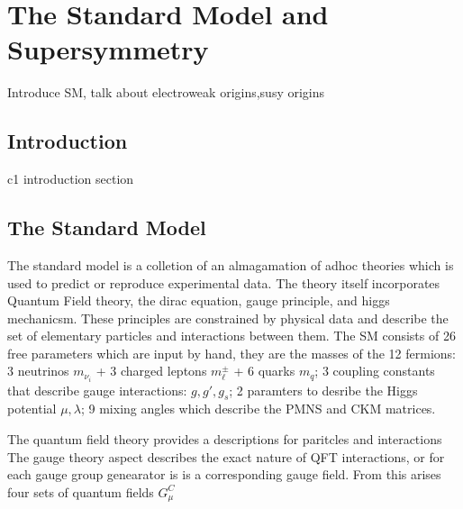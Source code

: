 



\setcounter{secnumdepth}{3}
\setcounter{tocdepth}{3}
\setlength{\parskip}{\smallskipamount}
\setlength{\parindent}{0pt}


\makeatletter


\providecommand{\tabularnewline}{\\}


\makeatother

%

\chapter{The Standard Model and Supersymmetry}

\begin{chapterabstract}
Introduce SM, talk about electroweak origins,susy origins
\end{chapterabstract}

\section{Introduction}

c1 introduction section

\section{The Standard Model}

The standard model is a colletion of an almagamation of adhoc theories which is used to predict or reproduce experimental data. The theory itself incorporates Quantum Field theory, the dirac equation, gauge principle, and higgs mechanicsm. These principles are constrained by physical data and describe the set of elementary particles and interactions between them. The SM  consists of 26 free parameters which are input by hand, they are the masses of the 12 fermions: 3 neutrinos $m_\nu_i$ + 3 charged leptons $m_\ell^\pm$ + 6 quarks $m_q$; 3 coupling constants that describe gauge interactions: $g, g', g_s$; 2 paramters to desribe the Higgs potential $\mu, \lambda$; 9 mixing angles which describe the  PMNS and CKM matrices.

The quantum field theory provides a descriptions for paritcles and interactions
The gauge theory aspect describes the exact nature of QFT interactions, or for each gauge group genearator is is a corresponding gauge field. From this arises four sets of quantum fields $G_\mu^C$ 


